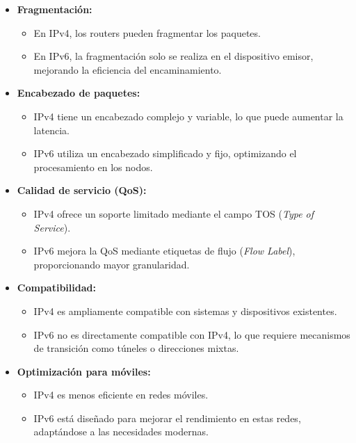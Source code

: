 \documentclass[a4paper,12pt]{article}
\begin{document}
\begin{itemize}
    \item \textbf{Fragmentación:}
    \begin{itemize}
        \item En IPv4, los routers pueden fragmentar los paquetes.
        \item En IPv6, la fragmentación solo se realiza en el dispositivo emisor, mejorando la eficiencia del encaminamiento.
    \end{itemize}

    \item \textbf{Encabezado de paquetes:}
    \begin{itemize}
        \item IPv4 tiene un encabezado complejo y variable, lo que puede aumentar la latencia.
        \item IPv6 utiliza un encabezado simplificado y fijo, optimizando el procesamiento en los nodos.
    \end{itemize}

    \item \textbf{Calidad de servicio (QoS):}
    \begin{itemize}
        \item IPv4 ofrece un soporte limitado mediante el campo TOS (\textit{Type of Service}).
        \item IPv6 mejora la QoS mediante etiquetas de flujo (\textit{Flow Label}), proporcionando mayor granularidad.
    \end{itemize}

    \item \textbf{Compatibilidad:}
    \begin{itemize}
        \item IPv4 es ampliamente compatible con sistemas y dispositivos existentes.
        \item IPv6 no es directamente compatible con IPv4, lo que requiere mecanismos de transición como túneles o direcciones mixtas.
    \end{itemize}

    \item \textbf{Optimización para móviles:}
    \begin{itemize}
        \item IPv4 es menos eficiente en redes móviles.
        \item IPv6 está diseñado para mejorar el rendimiento en estas redes, adaptándose a las necesidades modernas.
    \end{itemize}
\end{itemize}
\end{document}
